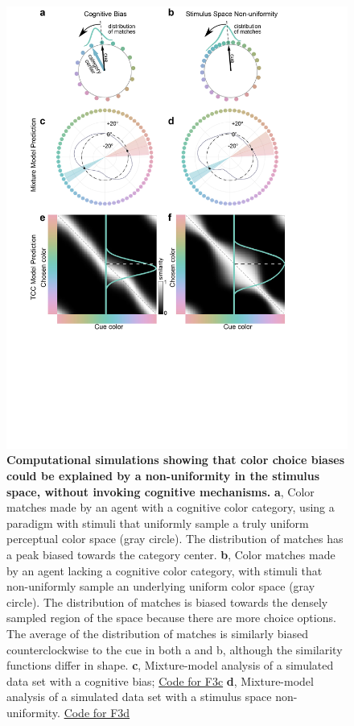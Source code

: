 \begin{figure}
    \begin{fullwidth}
    \centering
    \includegraphics[width=\textwidth,trim={0 7cm 0 0},clip]{../Figures/flat/F3_TCCModel_6.jpg}
    \caption{\textbf{Computational simulations showing that color choice biases could be explained by a non-uniformity in the stimulus space, without invoking cognitive mechanisms.} \textbf{a}, Color matches made by an agent with a cognitive color category, using a paradigm with stimuli that uniformly sample a truly uniform perceptual color space (gray circle). The distribution of matches has a peak biased towards the category center. \textbf{b}, Color matches made by an agent lacking a cognitive color category, with stimuli that non-uniformly sample an underlying uniform color space (gray circle). The distribution of matches is biased towards the densely sampled region of the space because there are more choice options. The average of the distribution of matches is similarly biased counterclockwise to the cue in both a and b, although the similarity functions differ in shape. \textbf{c}, Mixture-model analysis of a simulated data set with a cognitive bias; \href{https://github.com/NEI-LSR/MacaqueColorCategories/blob/main/Outputs/Paper/Figures/working/F3_TCCModel/Code/F3ace_TCCModel_OffsetGaussian.m}{Code for F3c} \textbf{d}, Mixture-model analysis of a simulated data set with a stimulus space non-uniformity. \href{https://github.com/NEI-LSR/MacaqueColorCategories/blob/main/Outputs/Paper/Figures/working/F3_TCCModel/Code/F3bdf_TCCModel_StimulusSpaceNonUnifomity.m}{Code for F3d}
}
\end{fullwidth}
\end{figure}
